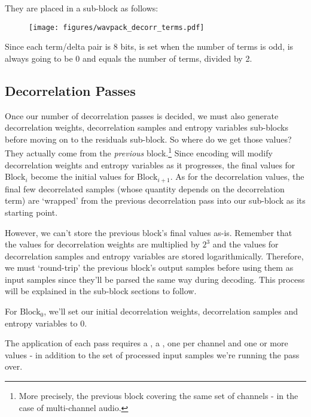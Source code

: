 \par
\noindent
They are placed in a sub-block as follows:
\begin{figure}[h]
\texttt{[image: figures/wavpack\_decorr\_terms.pdf]}
\end{figure}
\par
\noindent
Since each term/delta pair is 8 bits,
 is set when the number of terms is odd,
 is always going to be 0 and
 equals the number of terms, divided by 2.

\clearpage

\subsection{Decorrelation Passes}

Once our number of decorrelation passes is decided,
we must also generate decorrelation weights, decorrelation samples
and entropy variables sub-blocks before moving on to the residuals sub-block.
So where do we get those values?
They actually come from the \textit{previous} block.\footnote{More
precisely, the previous block covering the same set of channels -
in the case of multi-channel audio.}
Since encoding will modify decorrelation weights and entropy variables
as it progresses, the final values for $\text{Block}_i$ become
the initial values for $\text{Block}_{i + 1}$.
As for the decorrelation values, the final few decorrelated
samples (whose quantity depends on the decorrelation term)
are `wrapped' from the previous decorrelation pass
into our  sub-block as its starting point.

However, we can't store the previous block's final values as-is.
Remember that the values for decorrelation weights are
multiplied by $2 ^ 3$ and the values for decorrelation samples
and entropy variables are stored logarithmically.
Therefore, we must `round-trip' the previous block's output samples
before using them as input samples since they'll be
parsed the same way during decoding.
This process will be explained in the sub-block sections to follow.

For $\text{Block}_0$, we'll set our initial decorrelation weights,
decorrelation samples and entropy variables to 0.

The application of each pass requires a ,
a , one  per
channel and one or more  values -
in addition to the set of processed input samples we're running the pass
over.

